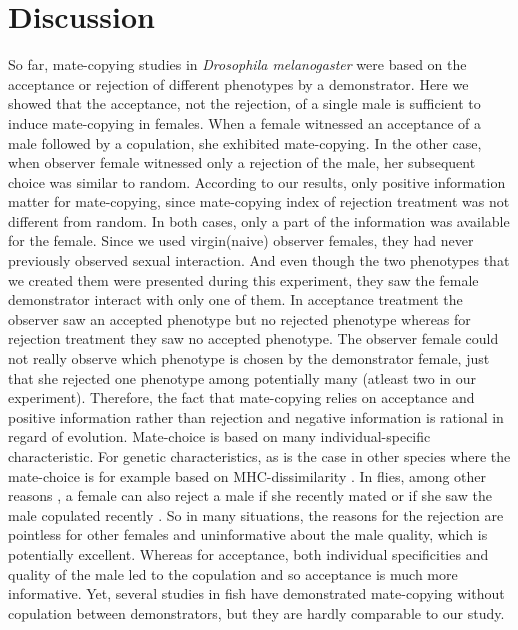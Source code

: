 \documentclass[a4paper, 12pt]{article}
\begin{document}
\clearpage
	


\section{Discussion}

So far, mate-copying studies in \textit{Drosophila melanogaster} were based on the acceptance or rejection of different phenotypes by a demonstrator.
Here we showed that the acceptance, not the rejection, of a single male is sufficient to induce mate-copying in females. 
When a female witnessed an acceptance of a male followed by a copulation, she exhibited mate-copying. 
In the other case, when observer female witnessed only a rejection of the male, her subsequent choice was similar to random. 
According to our results, only positive information matter for mate-copying, since mate-copying index of rejection treatment was not different from random.
In both cases, only a part of the information was available for the female. 
Since we used virgin(naive) observer females, they had never previously observed sexual interaction. 
And even though the two phenotypes that we created them were presented during this experiment, they saw the female demonstrator interact with only one of them. 
In acceptance treatment the observer saw an accepted phenotype but no rejected phenotype whereas for rejection treatment they saw no accepted phenotype. 
The observer female could not really observe which phenotype is chosen by the demonstrator female, just that she rejected one phenotype among potentially many (atleast two in our experiment).
Therefore, the fact that mate-copying relies on acceptance and positive information rather than rejection and negative information is rational in regard of evolution.
Mate-choice is based on many individual-specific characteristic. For genetic characteristics, as is the case in other species where the mate-choice is for example based on MHC-dissimilarity \parencite{wedekind_MHC_1995, landry_good_2001}. In flies, among other reasons \parencite{tennant_causes_2014}, a female can also reject a male if she recently mated \parencite{chapman_sex_2003} or if she saw the male copulated recently \parencite{loyau_when_2012}. 
So in many situations, the reasons for the rejection are pointless for other females and uninformative about the male quality, which is potentially excellent.
Whereas for acceptance, both individual specificities and quality of the male led to the copulation and so acceptance is much more informative.
Yet, several studies in fish have demonstrated mate-copying without copulation between demonstrators, but they are hardly comparable to our study. 
\end{document}
